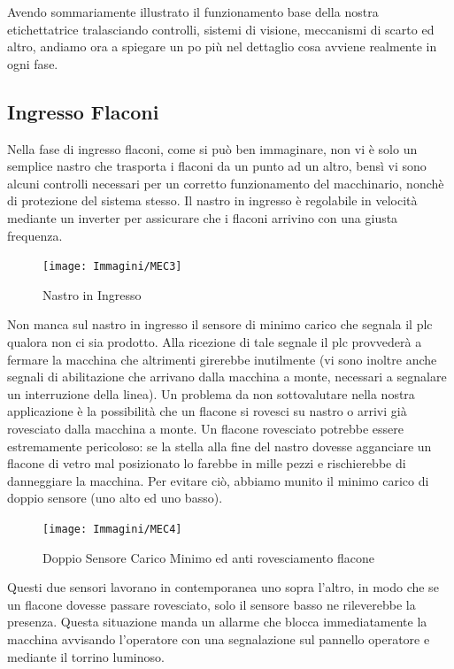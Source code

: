 \documentclass[12pt, a4paper, oneside]{book}
\begin{document}
Avendo sommariamente illustrato il funzionamento base della nostra etichettatrice tralasciando controlli, sistemi di visione, meccanismi di scarto ed altro, andiamo ora a spiegare un po più nel dettaglio cosa avviene realmente in ogni fase.

\subsection{Ingresso Flaconi}
Nella fase di ingresso flaconi, come si può ben immaginare, non vi è solo un semplice nastro che trasporta i flaconi da un punto ad un altro, bensì vi sono alcuni controlli necessari per un corretto funzionamento del macchinario, nonchè di protezione del sistema stesso. Il nastro in ingresso è regolabile in velocità mediante un inverter per assicurare che i flaconi arrivino con una giusta frequenza. 

\begin{figure}[H]
	\centering
	\texttt{[image: Immagini/MEC3]}
	\label{mec3}
	\caption{ Nastro in Ingresso}
\end{figure}

 Non manca sul nastro in ingresso il sensore di minimo carico che segnala il plc qualora non ci sia prodotto. Alla ricezione di tale segnale il plc provvederà a fermare la macchina che altrimenti girerebbe inutilmente (vi sono inoltre anche segnali di abilitazione che arrivano dalla macchina a monte, necessari a segnalare un interruzione della linea).
Un problema da non sottovalutare nella nostra applicazione è la possibilità che un flacone si rovesci su nastro o arrivi già rovesciato dalla macchina a monte. Un flacone rovesciato potrebbe essere estremamente pericoloso: se la stella alla fine del nastro dovesse agganciare un flacone di vetro mal posizionato lo farebbe in mille pezzi e rischierebbe di danneggiare la macchina. Per evitare ciò, abbiamo munito il minimo carico di doppio sensore (uno alto ed uno basso). 

\begin{figure}[H]
	\centering
	\texttt{[image: Immagini/MEC4]}
	\label{mec4}
	\caption{ Doppio Sensore Carico Minimo ed anti rovesciamento flacone}
\end{figure}

 Questi due sensori lavorano in contemporanea uno sopra l'altro, in modo che se un flacone dovesse passare rovesciato, solo il sensore basso ne rileverebbe la presenza. Questa situazione manda un allarme che blocca immediatamente la macchina avvisando l'operatore con una segnalazione sul pannello operatore e mediante il torrino luminoso.  
   
\end{document}
